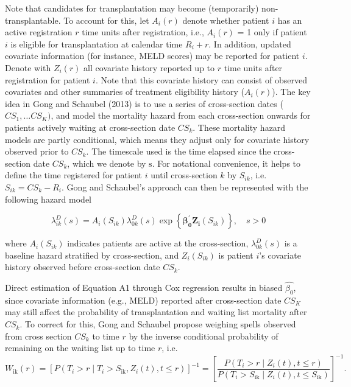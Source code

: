 \documentclass[11pt,twoside,]{book}
\begin{document}
Note that candidates for transplantation may become (temporarily) non-transplantable. To account for this, let \(A_{i}( r )\) denote whether patient \(i\) has an active registration \(r\) time units after registration, i.e.,
\(A_{i}( r )\) = 1 only if patient \(i\) is eligible
for transplantation at calendar time \(R_{i} + r.\) In addition, updated
covariate information (for instance, MELD scores) may be reported for patient
\(i\). Denote with \(Z_{i}( r )\) all covariate history reported
up to \(r\) time units after registration for patient \({i}\). Note
that this covariate history can consist of observed covariates and other
summaries of treatment eligibility history (\(A_{i}( r )\)).
\newpage
The key idea in Gong and Schaubel (2013) is to use a series
of cross-section dates (\(CS_{1},\ldots CS_{K})\), and model the mortality
hazard from each cross-section onwards for patients actively waiting at cross-section date \(CS_k\). These mortality hazard models are partly
conditional, which means they adjust only for covariate history observed prior to
\(CS_{k}\). The timescale used is the time elapsed since the cross-section
date \(CS_{k}\), which we denote by \(\text{s}\). For notational
convenience, it helps to define the time registered for patient \(i\)
until cross-section \(k\) by \(S_{ik}\), i.e.
\(S_{ik} = CS_{k} - R_{i}.\) Gong and Schaubel's approach can then be
represented with the following hazard model

\[
\lambda_{ik}^{D}( s ) = A_{i}( S_{ik} )\lambda_{0k}^{D}( s )\exp\left\{ \mathbf{\beta}_{\mathbf{0}}^{'}\mathbf{Z}_{\mathbf{i}}( S_{ik} ) \right\},\quad s > 0
\]

where \(A_{i}( S_{ik} )\) indicates patients are active
at the cross-section, \(\lambda_{0k}^{D}( s )\) is a baseline
hazard stratified by cross-section, and
\(Z_{i}( S_{ik} )\) is patient \(i\)'s covariate history
observed before cross-section date \(CS_{k}\).

Direct estimation of Equation A1 through Cox regression results in biased
\(\widehat{\beta_{0}}\), since covariate information (e.g., MELD) reported
after cross-section date \(CS_{K}\) may still affect the probability of
transplantation and waiting list mortality after \(CS_{k}\). To correct for
this, Gong and Schaubel propose weighing spells observed from cross
section \(CS_{k}\) to time \(r\) by the inverse conditional probability of
remaining on the waiting list up to time \(r\), i.e.
\[W_{\text{ik}}\left( r \right) = \left\lbrack P\left( T_{i} > r \middle| T_{i} > S_{\text{ik}},Z_{i}\left( t \right),t \leq r \right) \right\rbrack^{- 1} = \left\lbrack \frac{P\left( T_{i} > r \middle| Z_{i}\left( t \right),t \leq r \right)}{P\left( T_{i} > S_{\text{ik}} \middle| Z_{i}\left( t \right),t \leq S_{\text{ik}} \right)} \right\rbrack^{- 1}.\]
\end{document}

